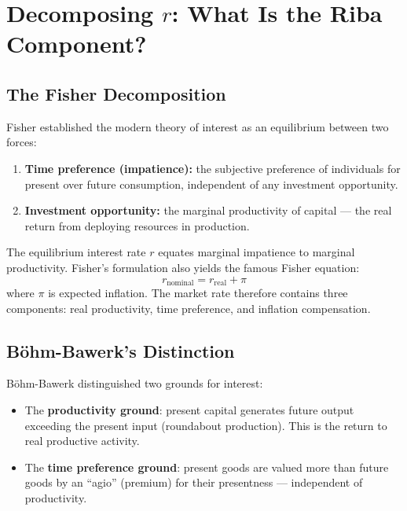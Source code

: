 \documentclass[10pt,twocolumn]{article}
\theoremstyle{plain}
\theoremstyle{definition}
\begin{document}
\section{Decomposing $r$: What Is the Riba Component?}
\label{sec:decomposition}

\subsection{The Fisher Decomposition}

Fisher \cite{Fisher1930} established the modern theory of interest
as an equilibrium between two forces:
\begin{enumerate}[leftmargin=*,noitemsep]
\item \textbf{Time preference (impatience):} the subjective
preference of individuals for present over future consumption,
independent of any investment opportunity.
\item \textbf{Investment opportunity:} the marginal productivity
of capital --- the real return from deploying resources in
production.
\end{enumerate}

The equilibrium interest rate $r$ equates marginal impatience
to marginal productivity. Fisher's formulation also yields the
famous Fisher equation:
\begin{equation}
r_{\text{nominal}} = r_{\text{real}} + \pi
\label{eq:fisher}
\end{equation}
where $\pi$ is expected inflation. The market rate therefore
contains three components: real productivity, time preference,
and inflation compensation.

\subsection{Böhm-Bawerk's Distinction}

Böhm-Bawerk \cite{BohmBawerk1890} distinguished two grounds
for interest:
\begin{itemize}[leftmargin=*, noitemsep]
\item The \textbf{productivity ground}: present capital generates
future output exceeding the present input (roundabout production).
This is the return to real productive activity.
\item The \textbf{time preference ground}: present goods are
valued more than future goods by an ``agio'' (premium) for
their presentness --- independent of productivity.
\end{itemize}
\end{document}
